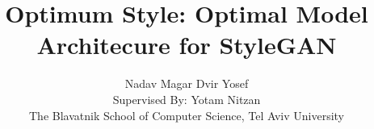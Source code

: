 \documentclass[10pt,twocolumn,letterpaper]{article}
\begin{document}
\title{
Optimum Style: Optimal Model Architecure for StyleGAN
}


\author{Nadav Magar \qquad \qquad Dvir Yosef \\[0.5em] Supervised By: Yotam Nitzan \\[0.3em] \small{The Blavatnik School of Computer Science, Tel Aviv University} }

\maketitle

% 

\begin{abstract}


\end{abstract}

%     







% 

% 



% 

\newpage



\end{document}
